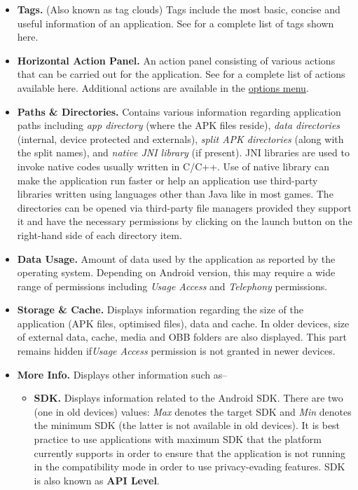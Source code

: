 \begin{itemize}
    \item \textbf{Tags.} (Also known as tag clouds) Tags include the most basic, concise and useful information of an
    application. See  for a complete list of tags shown here.

    \item \textbf{Horizontal Action Panel.} An action panel consisting of various actions that can be carried out for
    the application. See  for a complete list of actions available here.
    Additional actions are available in the \hyperref[subsubsec:app-info-options-menu]{options menu}.

    \item \textbf{Paths \& Directories.} Contains various information regarding application paths including \textit{app
    directory} (where the APK files reside), \textit{data directories} (internal, device protected and externals),
    \textit{split APK directories} (along with the split names), and \textit{native JNI library} (if present). JNI
    libraries are used to invoke native codes usually written in C/C++. Use of native library can make the application
    run faster or help an application use third-party libraries written using languages other than Java like in most
    games. The directories can be opened via third-party file managers provided they support it and have the necessary
    permissions by clicking on the launch button on the right-hand side of each directory item.

    \item \textbf{Data Usage.} Amount of data used by the application as reported by the operating system. Depending on
    Android version, this may require a wide range of permissions including \textit{Usage Access} and \textit{Telephony}
    permissions.

    \item \textbf{Storage \& Cache.} Displays information regarding the size of the application (APK files, optimised
    files), data and cache. In older devices, size of external data, cache, media and OBB folders are also displayed.
    This part remains hidden if\textit{Usage Access} permission is not granted in newer devices.

    \item \textbf{More Info.} Displays other information such as--
    \begin{itemize}
        \item \textbf{SDK.} Displays information related to the Android SDK. There are two (one in old devices) values:
        \textit{Max} denotes the target SDK and \textit{Min} denotes the minimum SDK (the latter is not available in old
        devices). It is best practice to use applications with maximum SDK that the platform currently supports in order
        to ensure that the application is not running in the compatibility mode in order to use privacy-evading features.
        SDK is also known as \textbf{API Level}.\\


\end{itemize}
\end{itemize}
